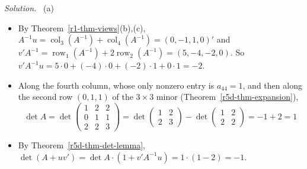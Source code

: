 \documentclass[12pt]{article}
\DeclareMathOperator{\row}{row}
\DeclareMathOperator{\col}{col}
\theoremstyle{definition}
\newenvironment{solution}{\par\noindent\textit{Solution.}\ }{\par\smallskip}
\begin{document}
\begin{solution}
(a)
\begin{itemize}
\item By Theorem~\ref{r1-thm-views}(b),(c), \(A^{-1}u=\col_3(A^{-1})+\col_4(A^{-1})=(0,-1,1,0)'\) and
\(v'A^{-1}=\row_1(A^{-1})+2\row_2(A^{-1})=(5,-4,-2,0)\). So \(v'A^{-1}u=5\cdot0+(-4)\cdot0+(-2)\cdot1+0\cdot1=-2\).
\item Along the fourth column, whose only nonzero entry is \(a_{44}=1\), and then along the second row \((0,1,1)\) of the
\(3\times3\) minor (Theorem~\ref{r5d-thm-expansion}),
\[
\det A=\det\begin{pmatrix}1&2&2\\0&1&1\\2&2&3\end{pmatrix}=\det\begin{pmatrix}1&2\\2&3\end{pmatrix}-\det\begin{pmatrix}1&2\\2&2\end{pmatrix}
=-1+2=1
\]
\item By Theorem~\ref{r5d-thm-det-lemma}, \(\det(A+uv')=\det A\cdot(1+v'A^{-1}u)=1\cdot(1-2)=-1\).
\end{itemize}


\end{solution}
\end{document}

